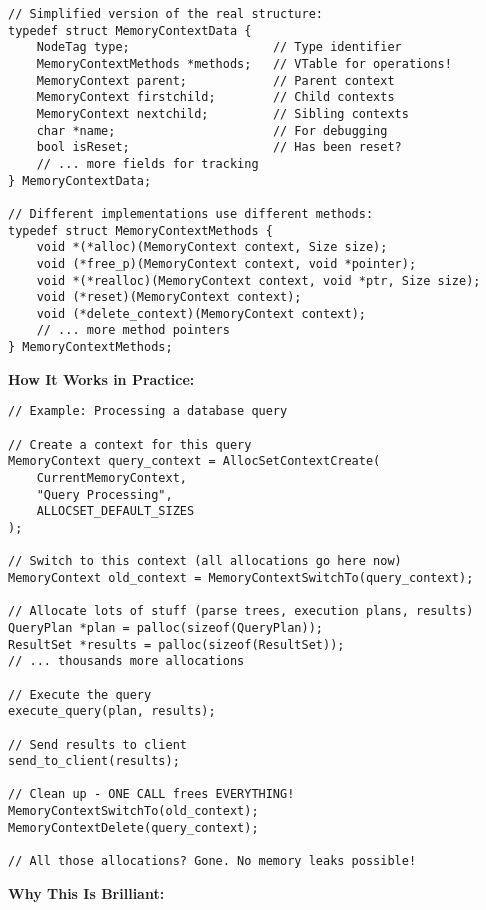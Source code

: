 \begin{lstlisting}
// Simplified version of the real structure:
typedef struct MemoryContextData {
    NodeTag type;                    // Type identifier
    MemoryContextMethods *methods;   // VTable for operations!
    MemoryContext parent;            // Parent context
    MemoryContext firstchild;        // Child contexts
    MemoryContext nextchild;         // Sibling contexts
    char *name;                      // For debugging
    bool isReset;                    // Has been reset?
    // ... more fields for tracking
} MemoryContextData;

// Different implementations use different methods:
typedef struct MemoryContextMethods {
    void *(*alloc)(MemoryContext context, Size size);
    void (*free_p)(MemoryContext context, void *pointer);
    void *(*realloc)(MemoryContext context, void *ptr, Size size);
    void (*reset)(MemoryContext context);
    void (*delete_context)(MemoryContext context);
    // ... more method pointers
} MemoryContextMethods;
\end{lstlisting}

\textbf{How It Works in Practice:}

\begin{lstlisting}
// Example: Processing a database query

// Create a context for this query
MemoryContext query_context = AllocSetContextCreate(
    CurrentMemoryContext,
    "Query Processing",
    ALLOCSET_DEFAULT_SIZES
);

// Switch to this context (all allocations go here now)
MemoryContext old_context = MemoryContextSwitchTo(query_context);

// Allocate lots of stuff (parse trees, execution plans, results)
QueryPlan *plan = palloc(sizeof(QueryPlan));
ResultSet *results = palloc(sizeof(ResultSet));
// ... thousands more allocations

// Execute the query
execute_query(plan, results);

// Send results to client
send_to_client(results);

// Clean up - ONE CALL frees EVERYTHING!
MemoryContextSwitchTo(old_context);
MemoryContextDelete(query_context);

// All those allocations? Gone. No memory leaks possible!
\end{lstlisting}

\textbf{Why This Is Brilliant:}


